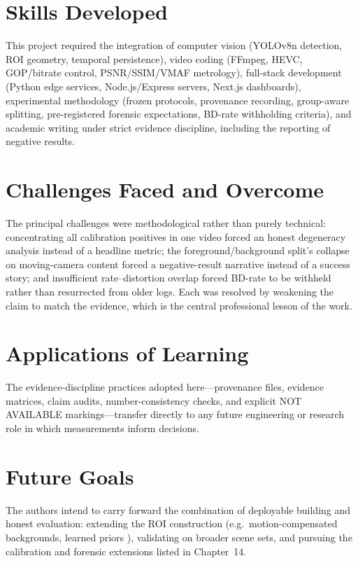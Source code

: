 \section{Skills Developed}

This project required the integration of computer vision (YOLOv8n detection, ROI geometry, temporal persistence), video coding (FFmpeg, HEVC, GOP/bitrate control, PSNR/SSIM/VMAF metrology), full-stack development (Python edge services, Node.js/Express servers, Next.js dashboards), experimental methodology (frozen protocols, provenance recording, group-aware splitting, pre-registered forensic expectations, BD-rate withholding criteria), and academic writing under strict evidence discipline, including the reporting of negative results.

\section{Challenges Faced and Overcome}

The principal challenges were methodological rather than purely technical: concentrating all calibration positives in one video forced an honest degeneracy analysis instead of a headline metric; the foreground/background split's collapse on moving-camera content forced a negative-result narrative instead of a success story; and insufficient rate--distortion overlap forced BD-rate to be withheld rather than resurrected from older logs. Each was resolved by weakening the claim to match the evidence, which is the central professional lesson of the work.

\section{Applications of Learning}

The evidence-discipline practices adopted here---provenance files, evidence matrices, claim audits, number-consistency checks, and explicit NOT AVAILABLE markings---transfer directly to any future engineering or research role in which measurements inform decisions.

\section{Future Goals}

The authors intend to carry forward the combination of deployable building and honest evaluation: extending the ROI construction (e.g.\ motion-compensated backgrounds, learned priors \cite{Zhao2025ASVC}), validating on broader scene sets, and pursuing the calibration and forensic extensions listed in Chapter~14.
